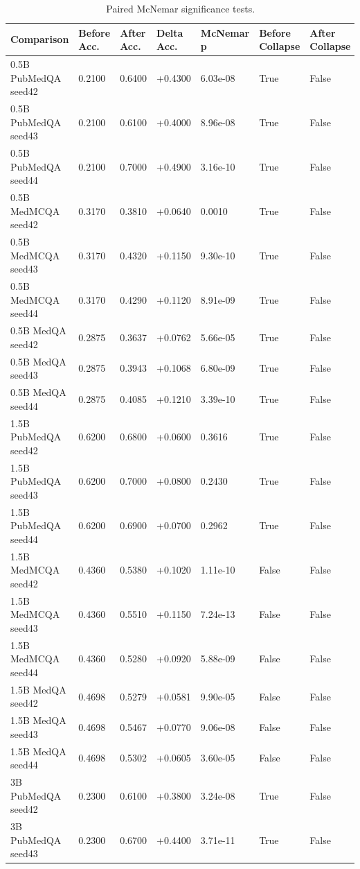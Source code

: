 \begin{table}[t]
\centering
\small
\caption{Paired McNemar significance tests.}
\label{tab:paired\_tests}
\begin{tabular}{lllllll}
\hline
Comparison & Before Acc. & After Acc. & Delta Acc. & McNemar p & Before Collapse & After Collapse \\
\hline
0.5B PubMedQA seed42 & 0.2100 & 0.6400 & +0.4300 & 6.03e-08 & True & False \\
0.5B PubMedQA seed43 & 0.2100 & 0.6100 & +0.4000 & 8.96e-08 & True & False \\
0.5B PubMedQA seed44 & 0.2100 & 0.7000 & +0.4900 & 3.16e-10 & True & False \\
0.5B MedMCQA seed42 & 0.3170 & 0.3810 & +0.0640 & 0.0010 & True & False \\
0.5B MedMCQA seed43 & 0.3170 & 0.4320 & +0.1150 & 9.30e-10 & True & False \\
0.5B MedMCQA seed44 & 0.3170 & 0.4290 & +0.1120 & 8.91e-09 & True & False \\
0.5B MedQA seed42 & 0.2875 & 0.3637 & +0.0762 & 5.66e-05 & True & False \\
0.5B MedQA seed43 & 0.2875 & 0.3943 & +0.1068 & 6.80e-09 & True & False \\
0.5B MedQA seed44 & 0.2875 & 0.4085 & +0.1210 & 3.39e-10 & True & False \\
1.5B PubMedQA seed42 & 0.6200 & 0.6800 & +0.0600 & 0.3616 & True & False \\
1.5B PubMedQA seed43 & 0.6200 & 0.7000 & +0.0800 & 0.2430 & True & False \\
1.5B PubMedQA seed44 & 0.6200 & 0.6900 & +0.0700 & 0.2962 & True & False \\
1.5B MedMCQA seed42 & 0.4360 & 0.5380 & +0.1020 & 1.11e-10 & False & False \\
1.5B MedMCQA seed43 & 0.4360 & 0.5510 & +0.1150 & 7.24e-13 & False & False \\
1.5B MedMCQA seed44 & 0.4360 & 0.5280 & +0.0920 & 5.88e-09 & False & False \\
1.5B MedQA seed42 & 0.4698 & 0.5279 & +0.0581 & 9.90e-05 & False & False \\
1.5B MedQA seed43 & 0.4698 & 0.5467 & +0.0770 & 9.06e-08 & False & False \\
1.5B MedQA seed44 & 0.4698 & 0.5302 & +0.0605 & 3.60e-05 & False & False \\
3B PubMedQA seed42 & 0.2300 & 0.6100 & +0.3800 & 3.24e-08 & True & False \\
3B PubMedQA seed43 & 0.2300 & 0.6700 & +0.4400 & 3.71e-11 & True & False \\

\end{tabular}
\end{table}
